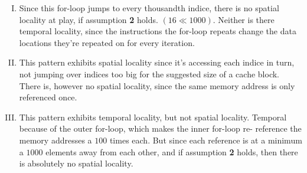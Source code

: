 \documentclass[fontsize=11pt, paper=a4, titlepage]{article}
\begin{document}
\begin{enumerate}[a)]
    \begin{enumerate}[I)]

        \item Since this for-loop jumps to every thousandth indice, there is no
spatial locality at play, if assumption \textbf{2} holds. $(16 \ll 1000)$.
Neither is there temporal locality, since the instructions the for-loop repeats
change the data locations they're repeated on for every iteration.

        \item This pattern exhibits spatial locality since it's accessing each
indice in turn, not jumping over indices too big for the suggested size of a
cache block. There is, however no spatial locality, since the same memory
address is only referenced once.

        \item This pattern exhibits temporal locality, but not spatial locality.
Temporal because of the outer for-loop, which makes the inner for-loop re-
reference the memory addresses a $100$ times each. But since each reference is
at a minimum a $1000$ elements away from each other, and if assumption
\textbf{2} holds, then there is absolutely no spatial locality.

    \end{enumerate}
\end{enumerate}
\end{document}
